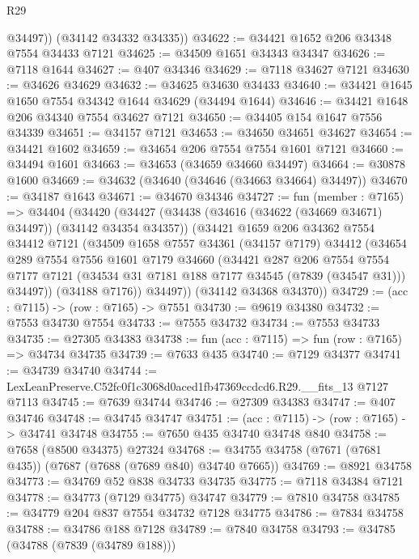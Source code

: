 \begin{lexlean}{R29}
\begin{coremodule}
          @34497))
      (@34142 @34332 @34335))
@34622 := @34421 @1652 @206 @34348 @7554 @34433 @7121
@34625 := @34509 @1651 @34343 @34347
@34626 := @7118 @1644
@34627 := @407 @34346
@34629 := @7118 @34627 @7121
@34630 := @34626 @34629
@34632 := @34625 @34630 @34433
@34640 := @34421 @1645 @1650 @7554 @34342 @1644 @34629 (@34494 @1644)
@34646 := @34421 @1648 @206 @34340 @7554 @34627 @7121
@34650 := @34405 @154 @1647 @7556 @34339
@34651 := @34157 @7121
@34653 := @34650 @34651 @34627
@34654 := @34421 @1602
@34659 := @34654 @206 @7554 @7554 @1601 @7121
@34660 := @34494 @1601
@34663 := @34653 (@34659 @34660 @34497)
@34664 := @30878 @1600
@34669 := @34632 (@34640 (@34646 (@34663 @34664) @34497))
@34670 := @34187 @1643
@34671 := @34670 @34346
@34727 := fun (member : @7165) =>
  @34404
    (@34420
      (@34427
        (@34438 (@34616 (@34622 (@34669 @34671) @34497)) (@34142 @34354 @34357))
        (@34421
          @1659
          @206
          @34362
          @7554
          @34412
          @7121
          (@34509
            @1658
            @7557
            @34361
            (@34157 @7179)
            @34412
            (@34654
              @289
              @7554
              @7556
              @1601
              @7179
              @34660
              (@34421
                @287
                @206
                @7554
                @7554
                @7177
                @7121
                (@34534 @31 @7181 @188 @7177 @34545 (@7839 (@34547 @31)))
                @34497))
            (@34188 @7176))
          @34497))
      (@34142 @34368 @34370))
@34729 := (acc : @7115) -> (row : @7165) -> @7551
@34730 := @9619 @34380
@34732 := @7553 @34730 @7554
@34733 := @7555 @34732
@34734 := @7553 @34733
@34735 := @27305 @34383
@34738 := fun (acc : @7115) => fun (row : @7165) => @34734 @34735
@34739 := @7633 @435
@34740 := @7129 @34377
@34741 := @34739 @34740
@34744 := LexLeanPreserve.C52fc0f1c3068d0aced1fb47369ccdcd6.R29.__fits_13 @7127 @7113
@34745 := @7639 @34744
@34746 := @27309 @34383
@34747 := @407 @34746
@34748 := @34745 @34747
@34751 := (acc : @7115) -> (row : @7165) -> @34741 @34748
@34755 := @7650 @435 @34740 @34748 @840
@34758 := @7658 (@8500 @34375) @27324
@34768 := @34755 @34758 (@7671 (@7681 @435)) (@7687 (@7688 (@7689 @840) @34740 @7665))
@34769 := @8921 @34758
@34773 := @34769 @52 @838 @34733 @34735
@34775 := @7118 @34384 @7121
@34778 := @34773 (@7129 @34775) @34747
@34779 := @7810 @34758
@34785 := @34779 @204 @837 @7554 @34732 @7128 @34775
@34786 := @7834 @34758
@34788 := @34786 @188 @7128
@34789 := @7840 @34758
@34793 := @34785 (@34788 (@7839 (@34789 @188)))

\end{coremodule}
\end{lexlean}
